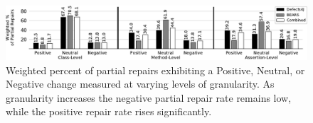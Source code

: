 \documentclass[10pt,journal,compsoc]{IEEEtran}
\newcommand\todo[1]{\textcolor{red}{#1}}
\newcommand\bears{\textsc{Bears}\xspace}
\begin{document}

\begin{figure}
        \includegraphics[width=\textwidth]{img/weighted_percent.pdf}
        \caption{\small Weighted percent of partial repairs exhibiting a {\normalfont
            Positive}, {\normalfont Neutral}, or {\normalfont Negative} change
          measured at varying levels of granularity. As granularity increases
          the negative partial repair rate remains low, while the positive
          repair rate rises significantly.}
        \label{fig:fitness}
\end{figure}
\end{document}
